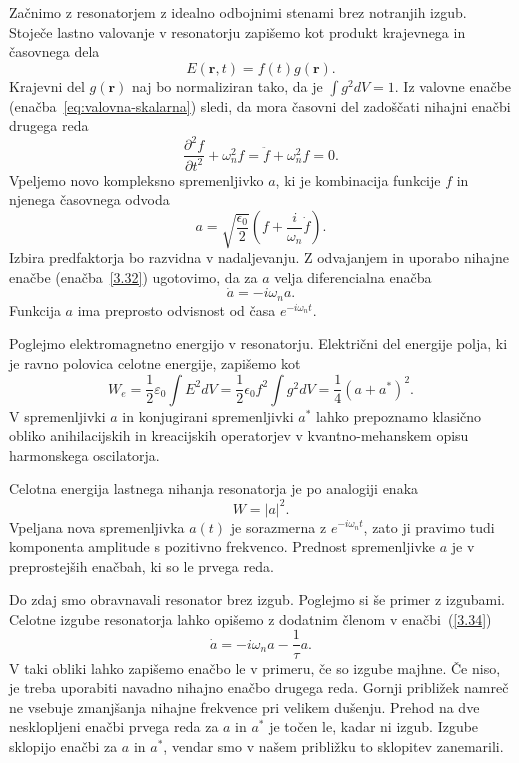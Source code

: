 Začnimo z resonatorjem z idealno odbojnimi stenami brez notranjih izgub. Stoječe
lastno valovanje v resonatorju zapišemo kot produkt krajevnega in časovnega
dela
\begin{equation}
E(\mathbf{r},t)=f(t)g(\mathbf{r}).
\label{3.31}
\end{equation}
Krajevni del $g(\mathbf{r})$ naj bo normaliziran tako, da je $\int g^{2}dV=1$. Iz valovne
enačbe (enačba~\ref{eq:valovna-skalarna}) sledi, da mora časovni del zadoščati 
nihajni enačbi drugega reda
\begin{equation}
\frac{\partial^2 f}{\partial t^2}+\omega_{n}^{2}f= \ddot{f} + \omega_{n}^{2}f=0.
\label{3.32}
\end{equation}
Vpeljemo novo kompleksno spremenljivko $a$, ki je kombinacija funkcije $f$ in njenega
časovnega odvoda
\begin{equation}
a=\sqrt{\frac{\epsilon_{0}}{2}}(f+\frac{i}{\omega_{n}}\dot{f}).
\label{3.33}
\end{equation}
Izbira predfaktorja bo razvidna v nadaljevanju. 
Z odvajanjem in uporabo nihajne enačbe (enačba~\ref{3.32}) ugotovimo, da za $a$ velja 
diferencialna enačba 
\begin{equation}
\dot{a}=-i\omega_{n}a.
\label{3.34}
\end{equation}
Funkcija $a$ ima preprosto odvisnost od časa $e^{-i\omega_{n}t}$. 

Poglejmo elektromagnetno energijo v resonatorju. Električni
del energije polja, ki je ravno polovica celotne energije, zapišemo kot
\begin{equation}
W_e = \frac{1}{2}\varepsilon_0 \int E^2 dV = \frac{1}{2}\epsilon_{0}f^{2}
\int g^{2}dV = \frac{1}{4} (a+a^{*})^2.
\end{equation}
V spremenljivki $a$ in konjugirani spremenljivki $a^{*}$ lahko prepoznamo 
klasično obliko anihilacijskih in kreacijskih operatorjev v kvantno-mehanskem 
opisu harmonskega oscilatorja. 

Celotna energija lastnega nihanja resonatorja je po analogiji enaka
\begin{equation}
W=|a|^2.
\label{3.35}
\end{equation}
Vpeljana nova spremenljivka $a(t)$ je sorazmerna z $e^{-i\omega_{n}t}$, 
zato ji pravimo tudi komponenta amplitude s pozitivno frekvenco. 
Prednost spremenljivke $a$ je v preprostejših enačbah, ki so le prvega reda. 

Do zdaj smo obravnavali resonator brez izgub. 
Poglejmo si še primer z izgubami. 
Celotne izgube resonatorja lahko opišemo z dodatnim členom v enačbi~(\ref{3.34})
\begin{equation}
\dot{a}=-i\omega_{n}a-\frac{1}{\tau}a.
\label{3.36}
\end{equation}
V taki obliki lahko zapišemo enačbo le v primeru, če so izgube majhne. Če niso, 
je treba uporabiti navadno nihajno enačbo drugega reda. Gornji približek
namreč ne vsebuje zmanjšanja nihajne frekvence pri velikem dušenju.
Prehod na dve nesklopljeni enačbi prvega reda za $a$ in $a^*$
je točen le, kadar ni izgub. Izgube sklopijo enačbi za $a$ in $a^{\ast}$, 
vendar smo v našem približku to sklopitev zanemarili.


